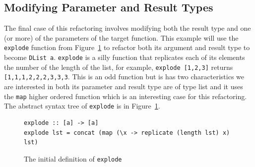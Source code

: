 \subsection{Modifying Parameter and Result Types}

The final case of this refactoring involves modifying both the result type and one (or more) of the parameters of the target function. This example will use the \texttt{explode} function from Figure~\ref{explode} to refactor both its argument and result type to become \texttt{DList a}. \texttt{explode} is a silly function that replicates each of its elements the number of the length of the list, for example, \texttt{explode [1,2,3]} returns \texttt{[1,1,1,2,2,2,3,3,3}. This is an odd function but is has two characteristics we are interested in both its parameter and result type are of type list and it uses the \texttt{map} higher ordered function which is an interesting case for this refactoring. The abstract syntax tree of \texttt{explode} is in Figure~\ref{explode}.

\begin{figure}[t]
\begin{lstlisting}
explode :: [a] -> [a]
explode lst = concat (map (\x -> replicate (length lst) x) lst)
\end{lstlisting}
\caption{The initial definition of \texttt{explode}}
\label{explode}
\end{figure}



